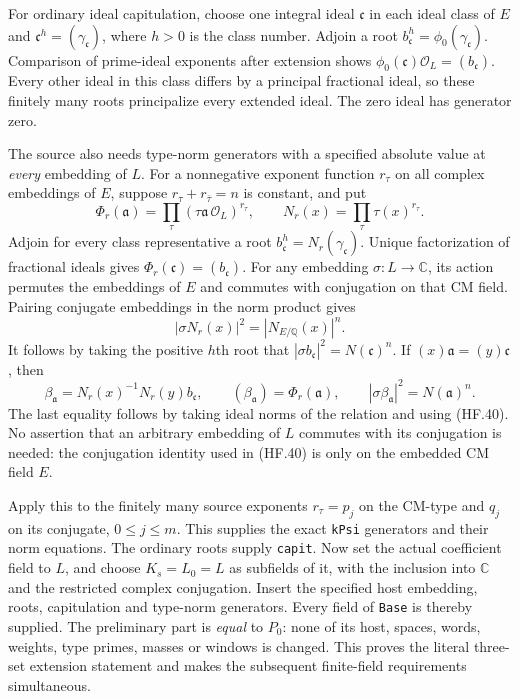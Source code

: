 For ordinary ideal capitulation, choose one integral
ideal $\mathfrak c$ in each ideal class of $E$ and
$\mathfrak c^h=(\gamma_\mathfrak c)$, where $h>0$
is the class number. Adjoin a root
$b_\mathfrak c^h=\phi_0(\gamma_\mathfrak c)$.
Comparison of prime-ideal exponents after extension
shows $\phi_0(\mathfrak c)\mathcal O_L=(b_\mathfrak c)$.
Every other ideal in this class differs by a principal
fractional ideal, so these finitely many roots
principalize every extended ideal. The zero ideal
has generator zero.

The source also needs type-norm generators with a
specified absolute value at \emph{every} embedding of
$L$. For a nonnegative exponent function $r_\tau$ on
all complex embeddings of $E$, suppose
$r_\tau+r_{\bar\tau}=n$ is constant, and put
\[
 \Phi_r(\mathfrak a)=\prod_\tau
           (\tau\mathfrak a\,\mathcal O_L)^{r_\tau},
 \qquad
 N_r(x)=\prod_\tau\tau(x)^{r_\tau}.
 \tag{HF.39}
\]
Adjoin for every class representative a root
$b_\mathfrak c^h=N_r(\gamma_\mathfrak c)$.
Unique factorization of fractional ideals gives
$\Phi_r(\mathfrak c)=(b_\mathfrak c)$.
For any embedding $\sigma:L\to\mathbb C$, its action
permutes the embeddings of $E$ and commutes with
conjugation on that CM field. Pairing conjugate
embeddings in the norm product gives
\[
        |\sigma N_r(x)|^2=|N_{E/\mathbb Q}(x)|^n.
 \tag{HF.40}
\]
It follows by taking the positive $h$th root that
$|\sigma b_\mathfrak c|^2=N(\mathfrak c)^n$.
If $(x)\mathfrak a=(y)\mathfrak c$, then
\[
 \beta_\mathfrak a=N_r(x)^{-1}N_r(y)b_\mathfrak c,
 \qquad
 (\beta_\mathfrak a)=\Phi_r(\mathfrak a),\qquad
 |\sigma\beta_\mathfrak a|^2=N(\mathfrak a)^n.
 \tag{HF.41}
\]
The last equality follows by taking ideal norms of
the relation and using (HF.40). No assertion that
an arbitrary embedding of $L$ commutes with its
conjugation is needed: the conjugation identity
used in (HF.40) is only on the embedded CM field $E$.

Apply this to the finitely many source exponents
$r_\tau=p_j$ on the CM-type and $q_j$ on its conjugate,
$0\le j\le m$. This supplies the exact
\texttt{kPsi} generators and their norm equations.
The ordinary roots supply \texttt{capit}.
Now set the actual coefficient field to $L$, and
choose $K_s=L_0=L$ as subfields of it, with the
inclusion into $\mathbb C$ and the restricted complex
conjugation. Insert the specified host embedding,
roots, capitulation and type-norm generators.
Every field of \texttt{Base} is thereby supplied.
The preliminary part is \emph{equal} to $P_0$:
none of its host, spaces, words, weights, type
primes, masses or windows is changed.
This proves the literal three-set extension
statement and makes the subsequent finite-field
requirements simultaneous.

